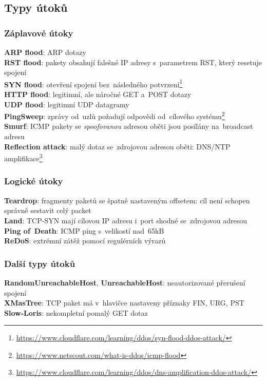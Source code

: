 \subsection{Typy útoků}

\subsubsection{Záplavové útoky}

\textbf{ARP flood}: ARP dotazy \\
\textbf{RST flood}: pakety obsahují falešné IP adresy s~parametrem RST, který resetuje spojení \\
\textbf{SYN flood}: otevření spojení bez~následného potvrzení\footnote{\url{https://www.cloudflare.com/learning/ddos/syn-flood-ddos-attack/}} \\
\textbf{HTTP flood}: legitimní, ale náročné GET a~POST dotazy \\
\textbf{UDP flood}: legitimní UDP datagramy \\
\textbf{PingSweep}: zprávy od~uzlů požadují odpovědi od~cílového systému\footnote{\url{https://www.netscout.com/what-is-ddos/icmp-flood}} \\
\textbf{Smurf}: ICMP pakety se \emph{spoofovanou} adresou oběti jsou posílány na~broadcast adresu \\
\textbf{Reflection attack}: malý dotaz se~zdrojovou adresou oběti: DNS/NTP amplifikace\footnote{\url{https://www.cloudflare.com/learning/ddos/dns-amplification-ddos-attack/}}
 

\subsubsection{Logické útoky}

\textbf{Teardrop}: fragmenty paketů se špatně nastaveným offsetem: cíl není schopen správně sestavit celý packet \\
\textbf{Land}: TCP-SYN mají cílovou IP adresu i~port shodné se~zdrojovou adresou \\
\textbf{Ping of~Death}: ICMP ping s~velikostí nad~65kB \\
\textbf{ReDoS}: extrémní zátěž pomocí regulérních výrazů

\subsubsection{Další typy útoků}

\textbf{RandomUnreachableHost}, \textbf{UnreachableHost}: neautorizované přerušení spojení \\
\textbf{XMasTree}: TCP paket má v~hlavičce nastaveny příznaky FIN, URG, PST \\
\textbf{Slow-Loris}: nekompletní pomalý GET dotaz

